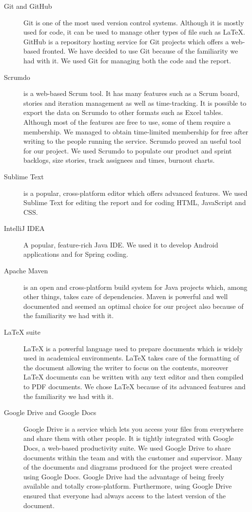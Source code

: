 \begin{description}

\item[Git and GitHub]
Git is one of the most used version control systems. Although it is mostly used for code, it can be used to manage other types of file such as LaTeX. GitHub is a repository hosting service for Git projects which offers a web-based fronted. We have decided to use Git because of the familiarity we had with it. We used Git for managing both the code and the report.

\item[Scrumdo]
is a web-based Scrum tool. It has many features such as a Scrum board, stories and iteration management as well as time-tracking. 
It is possible to export the data on Scrumdo to other formats such as Excel tables.
Although most of the features are free to use, some of them require a membership. We managed to obtain time-limited membership for free after writing to the people running the service. 
Scrumdo proved an useful tool for our project. We used Scrumdo to populate our product and sprint backlogs, size stories, track assignees and times, burnout charts.

\item[Sublime Text]
is a popular, cross-platform editor which offers advanced features.
We used Sublime Text for editing the report and for coding HTML, JavaScript and CSS.

\item[IntelliJ IDEA]
A popular, feature-rich Java IDE. We used it to develop Android applications and for Spring coding.

\item[Apache Maven]
is an open and cross-platform build system for Java projects which, among other things, takes care of dependencies.
Maven is powerful and well documented and seemed an optimal choice for our project also because of the familiarity
we had with it.

\item[LaTeX suite]
LaTeX is a powerful language used to prepare documents which is widely used in academical environments.
LaTeX takes care of the formatting of the document allowing the writer to focus on the contents, moreover LaTeX documents can be written with any text editor and then compiled to PDF documents. 
We chose LaTeX because of its advanced features and the familiarity we had with it.

\item[Google Drive and Google Docs]
Google Drive is a service which lets you access your files from everywhere and share them with other people.
It is tightly integrated with Google Docs, a web-based productivity suite. We used Google Drive to share documents
within the team and with the customer and supervisor.
Many of the documents and diagrams produced for the project were created using Google Docs.
Google Drive had the advantage of being freely available and totally cross-platform. Furthermore, using Google Drive ensured that everyone had always access to the latest version of the document.


\end{description}
